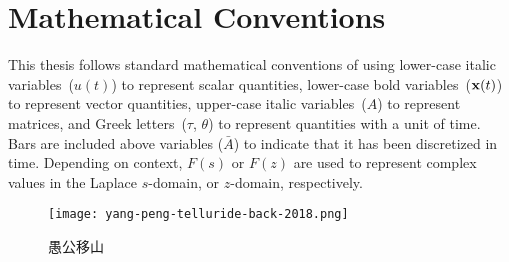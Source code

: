 \cleardoublepage
{}
\renewcommand\contentsname{Table of Contents}
\tableofcontents
\cleardoublepage
{}

\iffalse
\addcontentsline{toc}{chapter}{List of Todos}
\listoftodos
\cleardoublepage
\phantomsection
\fi

\listoftables
\cleardoublepage
{}

\listoffigures
\cleardoublepage
{}

\listoftheorems[ignoreall,show={theorem,lemma}]
\cleardoublepage
{}

\chapter*{Mathematical Conventions}
\label{typography}

This thesis follows standard mathematical conventions of using lower-case italic variables~($u(t)$) to represent scalar quantities, lower-case bold variables~($\mathbf{x}(t)$) to represent vector quantities, upper-case italic variables~($A$) to represent matrices, and Greek letters~($\tau$, $\theta$) to represent quantities with a unit of time.
Bars are included above variables ($\bar{A}$) to indicate that it has been discretized in time.
Depending on context, $F(s)$ or $F(z)$ are used to represent complex values in the Laplace $s$-domain, or $z$-domain, respectively.

\cleardoublepage
{}

\begin{figure}
\centering
\vspace*{\fill}
\begingroup
\texttt{[image: yang-peng-telluride-back-2018.png]}
\endgroup

\vspace{1em} 

\begin{CJK*}{UTF8}{gbsn}
愚公移山
\end{CJK*}
\vspace*{\fill}
\end{figure}

\cleardoublepage
{}

